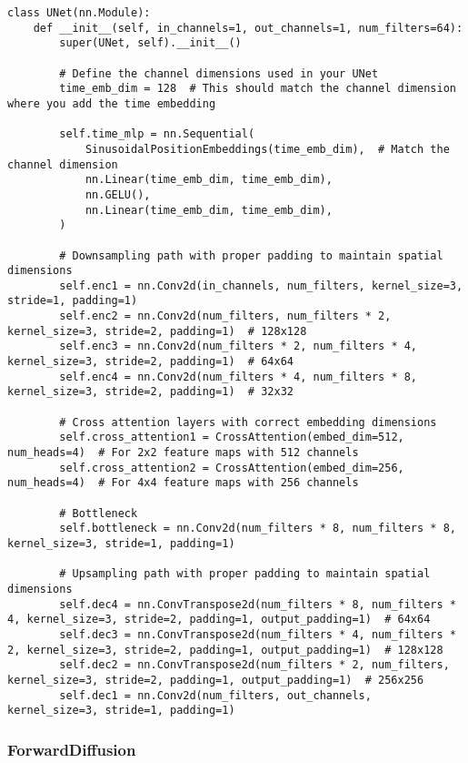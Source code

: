 \newpage

\begin{lstlisting}[basicstyle=\tiny]
class UNet(nn.Module):
    def __init__(self, in_channels=1, out_channels=1, num_filters=64):
        super(UNet, self).__init__()

        # Define the channel dimensions used in your UNet
        time_emb_dim = 128  # This should match the channel dimension where you add the time embedding
        
        self.time_mlp = nn.Sequential(
            SinusoidalPositionEmbeddings(time_emb_dim),  # Match the channel dimension
            nn.Linear(time_emb_dim, time_emb_dim),
            nn.GELU(),
            nn.Linear(time_emb_dim, time_emb_dim),
        )

        # Downsampling path with proper padding to maintain spatial dimensions
        self.enc1 = nn.Conv2d(in_channels, num_filters, kernel_size=3, stride=1, padding=1)
        self.enc2 = nn.Conv2d(num_filters, num_filters * 2, kernel_size=3, stride=2, padding=1)  # 128x128
        self.enc3 = nn.Conv2d(num_filters * 2, num_filters * 4, kernel_size=3, stride=2, padding=1)  # 64x64
        self.enc4 = nn.Conv2d(num_filters * 4, num_filters * 8, kernel_size=3, stride=2, padding=1)  # 32x32

        # Cross attention layers with correct embedding dimensions
        self.cross_attention1 = CrossAttention(embed_dim=512, num_heads=4)  # For 2x2 feature maps with 512 channels
        self.cross_attention2 = CrossAttention(embed_dim=256, num_heads=4)  # For 4x4 feature maps with 256 channels

        # Bottleneck
        self.bottleneck = nn.Conv2d(num_filters * 8, num_filters * 8, kernel_size=3, stride=1, padding=1)

        # Upsampling path with proper padding to maintain spatial dimensions
        self.dec4 = nn.ConvTranspose2d(num_filters * 8, num_filters * 4, kernel_size=3, stride=2, padding=1, output_padding=1)  # 64x64
        self.dec3 = nn.ConvTranspose2d(num_filters * 4, num_filters * 2, kernel_size=3, stride=2, padding=1, output_padding=1)  # 128x128
        self.dec2 = nn.ConvTranspose2d(num_filters * 2, num_filters, kernel_size=3, stride=2, padding=1, output_padding=1)  # 256x256
        self.dec1 = nn.Conv2d(num_filters, out_channels, kernel_size=3, stride=1, padding=1)

\end{lstlisting}

\subsubsection{ForwardDiffusion}


